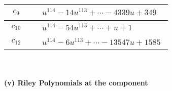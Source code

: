 \documentclass[1p]{elsarticle_modified}
\theoremstyle{definition}
\begin{document}
\begin{tabular}{m{50pt}|m{274pt}}
\hline $$\begin{aligned}c_{9}\end{aligned}$$&$\begin{aligned}
&u^{114}-14 u^{113}+\cdots-4339 u+349
\end{aligned}$\\
\hline $$\begin{aligned}c_{10}\end{aligned}$$&$\begin{aligned}
&u^{114}-54 u^{113}+\cdots+u+1
\end{aligned}$\\
\hline $$\begin{aligned}c_{12}\end{aligned}$$&$\begin{aligned}
&u^{114}-6 u^{113}+\cdots-13547 u+1585
\end{aligned}$\\
\hline
\end{tabular}\\~\\
\newpage\renewcommand{\arraystretch}{1}
\flushleft \textbf{(v) Riley Polynomials at the component}\newline \\
\end{document}
